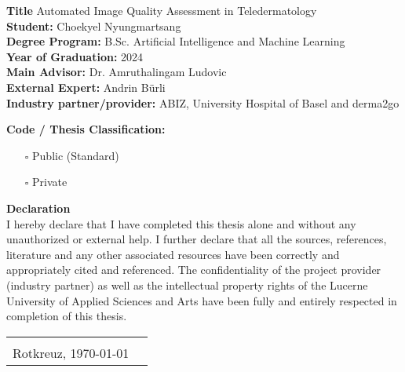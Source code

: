 \begin{titlepage}
\vspace{0.75cm}
\begin{sloppypar}
\noindent\textbf{Title} Automated Image Quality Assessment in Teledermatology\\

\noindent\textbf{Student:} Choekyel Nyungmartsang\\

\noindent\textbf{Degree Program:} B.Sc. Artificial Intelligence and Machine Learning\\

\noindent\textbf{Year of Graduation:} 2024\\

\noindent\textbf{Main Advisor:} Dr. Amruthalingam Ludovic\\

\noindent\textbf{External Expert:} Andrin Bürli\\

\noindent\textbf{Industry partner/provider:} ABIZ, University Hospital of Basel and derma2go\\
\end{sloppypar}
\vspace{2em}
\noindent\textbf{Code / Thesis Classification:}
\begin{itemize}
	\item[\rlap{\raisebox{0.3ex}{\hspace{0.4ex}\tiny \ding{56}}}$\square$]
	Public (Standard)
	\item[$\square$]
	Private
\end{itemize}

\vspace{3em}
\noindent
\textbf{Declaration}\\
I hereby declare that I have completed this thesis alone and without any unauthorized or external help. I further declare that all the sources, references, literature and any other associated resources have been correctly and appropriately cited and referenced. The confidentiality of the project provider (industry partner) as well as the intellectual property rights of the Lucerne University of Applied Sciences and Arts have been fully and entirely respected in completion of this thesis.\\
\begin{tabularx}{\textwidth}{@{}lX}
	&\\
	Rotkreuz, \today &  \\
	\cline{2-2}
\end{tabularx}


\end{titlepage}
